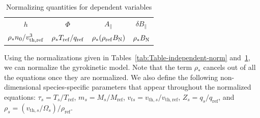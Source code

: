 \documentclass{jpp}
\begin{document}
\begin{table}
\centering
\begin{tabular}{c|c|c|c}
 $h$ & $\Phi$ & $A_{\parallel}$ & $\delta\!B_{\parallel}$  \\[3pt]
 $\rho_* n_0/v^3_{\rm{th, ref}}$  & $\rho_{*}T_{\rm{ref}}/q_{\rm{ref}}$  & $\rho_{*}(\rho_\mathrm{ref} B_{\rm{N}})$ & $\rho_{*} B_{\rm{N}}$\\
\end{tabular}
\caption{Normalizing quantities for dependent variables}
\label{tab:Table-dependent-norm}
\end{table}
Using the normalizations given in Tables~\ref{tab:Table-independent-norm} and~\ref{tab:Table-dependent-norm}, we can normalize the gyrokinetic model. Note that the term $\rho_{*}$ cancels out of all the equations once they are normalized. We also define the following non-dimensional species-specific parameters that appear throughout the normalized equations: $\tau_s = T_s/T_\mathrm{ref}$, $m_s = M_s/M_\mathrm{ref}$, $v_{ts} = v_{\mathrm{th},s}/v_\mathrm{th,ref}$, $Z_s = q_s/q_\mathrm{ref}$, and $\rho_s = (v_{\mathrm{th},s}/\Omega_s)/\rho_\mathrm{ref}$.
\end{document}
